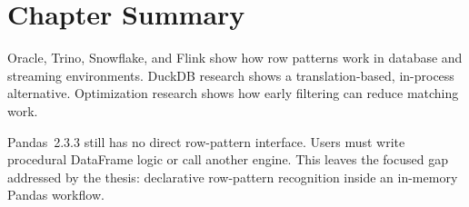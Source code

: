 \section{Chapter Summary}
\label{sec:related-summary}

Oracle, Trino, Snowflake, and Flink show how row patterns work in
database and streaming environments.  DuckDB research shows a
translation-based, in-process alternative.  Optimization research
shows how early filtering can reduce matching work.

Pandas~2.3.3 still has no direct row-pattern interface.  Users must
write procedural DataFrame logic or call another engine.  This leaves
the focused gap addressed by the thesis: declarative row-pattern
recognition inside an in-memory Pandas workflow.

